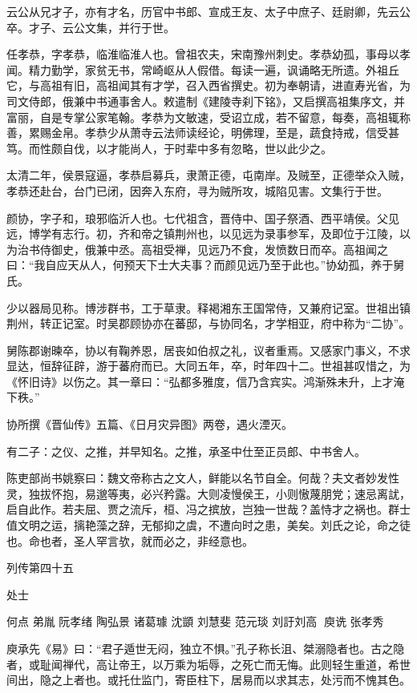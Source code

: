 \documentclass[12pt,UTF8]{ctexbook}
\begin{document}
云公从兄才子，亦有才名，历官中书郎、宣成王友、太子中庶子、廷尉卿，先云公卒。才子、云公文集，并行于世。

任孝恭，字孝恭，临淮临淮人也。曾祖农夫，宋南豫州刺史。孝恭幼孤，事母以孝闻。精力勤学，家贫无书，常崎岖从人假借。每读一遍，讽诵略无所遗。外祖丘它，与高祖有旧，高祖闻其有才学，召入西省撰史。初为奉朝请，进直寿光省，为司文侍郎，俄兼中书通事舍人。敕遣制《建陵寺刹下铭》，又启撰高祖集序文，并富丽，自是专掌公家笔翰。孝恭为文敏速，受诏立成，若不留意，每奏，高祖辄称善，累赐金帛。孝恭少从萧寺云法师读经论，明佛理，至是，蔬食持戒，信受甚笃。而性颇自伐，以才能尚人，于时辈中多有忽略，世以此少之。

太清二年，侯景寇逼，孝恭启募兵，隶萧正德，屯南岸。及贼至，正德举众入贼，孝恭还赴台，台门已闭，因奔入东府，寻为贼所攻，城陷见害。文集行于世。

颜协，字子和，琅邪临沂人也。七代祖含，晋侍中、国子祭酒、西平靖侯。父见远，博学有志行。初，齐和帝之镇荆州也，以见远为录事参军，及即位于江陵，以为治书侍御史，俄兼中丞。高祖受禅，见远乃不食，发愤数日而卒。高祖闻之曰：“我自应天从人，何预天下士大夫事？而颜见远乃至于此也。”协幼孤，养于舅氏。

少以器局见称。博涉群书，工于草隶。释褐湘东王国常侍，又兼府记室。世祖出镇荆州，转正记室。时吴郡顾协亦在蕃邸，与协同名，才学相亚，府中称为“二协”。

舅陈郡谢暕卒，协以有鞠养恩，居丧如伯叔之礼，议者重焉。又感家门事义，不求显达，恒辞征辟，游于蕃府而已。大同五年，卒，时年四十二。世祖甚叹惜之，为《怀旧诗》以伤之。其一章曰：“弘都多雅度，信乃含宾实。鸿渐殊未升，上才淹下秩。”

协所撰《晋仙传》五篇、《日月灾异图》两卷，遇火湮灭。

有二子：之仪、之推，并早知名。之推，承圣中仕至正员郎、中书舍人。

陈吏部尚书姚察曰：魏文帝称古之文人，鲜能以名节自全。何哉？夫文者妙发性灵，独拔怀抱，易邈等夷，必兴矜露。大则凌慢侯王，小则慠蔑朋党；速忌离訧，启自此作。若夫屈、贾之流斥，桓、冯之摈放，岂独一世哉？盖恃才之祸也。群士值文明之运，摛艳藻之辞，无郁抑之虞，不遭向时之患，美矣。刘氏之论，命之徒也。命也者，圣人罕言欤，就而必之，非经意也。





列传第四十五

处士

何点 弟胤 阮孝绪 陶弘景 诸葛璩 沈顗 刘慧斐 范元琰 刘訏刘高 庾诜 张孝秀

庾承先《易》曰：“君子遁世无闷，独立不惧。”孔子称长沮、桀溺隐者也。古之隐者，或耻闻禅代，高让帝王，以万乘为垢辱，之死亡而无悔。此则轻生重道，希世间出，隐之上者也。或托仕监门，寄臣柱下，居易而以求其志，处污而不愧其色。
\end{document}
